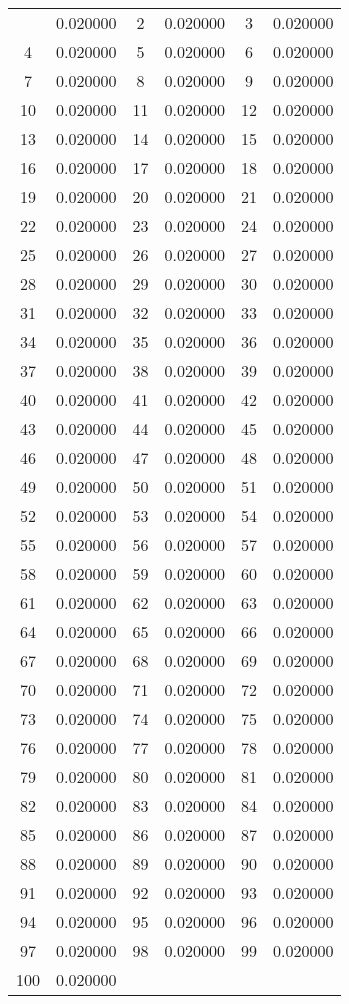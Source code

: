 \documentclass[12pt]{article}
\begin{document}
\begin{longtable}{@{}cc|cc|cc@{}}
\bottomrule
\endlastfoot
1 & 0.020000 & 2 & 0.020000 & 3 & 0.020000 \\
4 & 0.020000 & 5 & 0.020000 & 6 & 0.020000 \\
7 & 0.020000 & 8 & 0.020000 & 9 & 0.020000 \\
10 & 0.020000 & 11 & 0.020000 & 12 & 0.020000 \\
13 & 0.020000 & 14 & 0.020000 & 15 & 0.020000 \\
16 & 0.020000 & 17 & 0.020000 & 18 & 0.020000 \\
19 & 0.020000 & 20 & 0.020000 & 21 & 0.020000 \\
22 & 0.020000 & 23 & 0.020000 & 24 & 0.020000 \\
25 & 0.020000 & 26 & 0.020000 & 27 & 0.020000 \\
28 & 0.020000 & 29 & 0.020000 & 30 & 0.020000 \\
31 & 0.020000 & 32 & 0.020000 & 33 & 0.020000 \\
34 & 0.020000 & 35 & 0.020000 & 36 & 0.020000 \\
37 & 0.020000 & 38 & 0.020000 & 39 & 0.020000 \\
40 & 0.020000 & 41 & 0.020000 & 42 & 0.020000 \\
43 & 0.020000 & 44 & 0.020000 & 45 & 0.020000 \\
46 & 0.020000 & 47 & 0.020000 & 48 & 0.020000 \\
49 & 0.020000 & 50 & 0.020000 & 51 & 0.020000 \\
52 & 0.020000 & 53 & 0.020000 & 54 & 0.020000 \\
55 & 0.020000 & 56 & 0.020000 & 57 & 0.020000 \\
58 & 0.020000 & 59 & 0.020000 & 60 & 0.020000 \\
61 & 0.020000 & 62 & 0.020000 & 63 & 0.020000 \\
64 & 0.020000 & 65 & 0.020000 & 66 & 0.020000 \\
67 & 0.020000 & 68 & 0.020000 & 69 & 0.020000 \\
70 & 0.020000 & 71 & 0.020000 & 72 & 0.020000 \\
73 & 0.020000 & 74 & 0.020000 & 75 & 0.020000 \\
76 & 0.020000 & 77 & 0.020000 & 78 & 0.020000 \\
79 & 0.020000 & 80 & 0.020000 & 81 & 0.020000 \\
82 & 0.020000 & 83 & 0.020000 & 84 & 0.020000 \\
85 & 0.020000 & 86 & 0.020000 & 87 & 0.020000 \\
88 & 0.020000 & 89 & 0.020000 & 90 & 0.020000 \\
91 & 0.020000 & 92 & 0.020000 & 93 & 0.020000 \\
94 & 0.020000 & 95 & 0.020000 & 96 & 0.020000 \\
97 & 0.020000 & 98 & 0.020000 & 99 & 0.020000 \\
100 & 0.020000 &  &  &  &  \\

\end{longtable}
\end{document}
